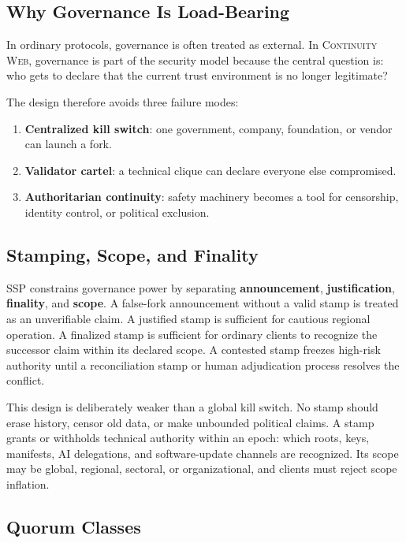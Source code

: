 \documentclass[11pt,letterpaper]{article}
\newcommand{\CW}{\textsc{Continuity Web}}
\newcommand{\Term}[1]{\textbf{#1}}
\newcommand{\Risk}[1]{\textbf{#1}}
\begin{document}
\subsection{Why Governance Is Load-Bearing}

In ordinary protocols, governance is often treated as external. In \CW{}, governance is part of the security model because the central question is: who gets to declare that the current trust environment is no longer legitimate?

The design therefore avoids three failure modes:

\begin{enumerate}[leftmargin=1.6em]
\item \Risk{Centralized kill switch}: one government, company, foundation, or vendor can launch a fork.
\item \Risk{Validator cartel}: a technical clique can declare everyone else compromised.
\item \Risk{Authoritarian continuity}: safety machinery becomes a tool for censorship, identity control, or political exclusion.
\end{enumerate}

\subsection{Stamping, Scope, and Finality}

SSP constrains governance power by separating \Term{announcement}, \Term{justification}, \Term{finality}, and \Term{scope}. A false-fork announcement without a valid stamp is treated as an unverifiable claim. A justified stamp is sufficient for cautious regional operation. A finalized stamp is sufficient for ordinary clients to recognize the successor claim within its declared scope. A contested stamp freezes high-risk authority until a reconciliation stamp or human adjudication process resolves the conflict.

This design is deliberately weaker than a global kill switch. No stamp should erase history, censor old data, or make unbounded political claims. A stamp grants or withholds technical authority within an epoch: which roots, keys, manifests, AI delegations, and software-update channels are recognized. Its scope may be global, regional, sectoral, or organizational, and clients must reject scope inflation.

\subsection{Quorum Classes}
\end{document}
